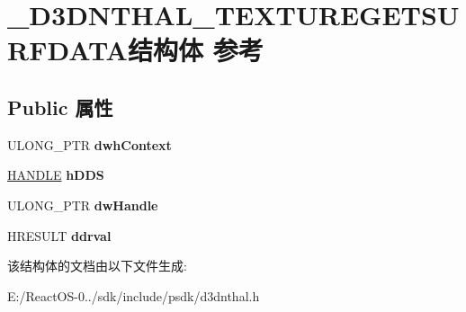 \hypertarget{struct___d3_d_n_t_h_a_l___t_e_x_t_u_r_e_g_e_t_s_u_r_f_d_a_t_a}{}\section{\+\_\+\+D3\+D\+N\+T\+H\+A\+L\+\_\+\+T\+E\+X\+T\+U\+R\+E\+G\+E\+T\+S\+U\+R\+F\+D\+A\+T\+A结构体 参考}
\label{struct___d3_d_n_t_h_a_l___t_e_x_t_u_r_e_g_e_t_s_u_r_f_d_a_t_a}
\subsection*{Public 属性}
\begin{DoxyCompactItemize}
\item 
\mbox{\label{struct___d3_d_n_t_h_a_l___t_e_x_t_u_r_e_g_e_t_s_u_r_f_d_a_t_a_adf7ccdf4cd65da4a59696a773cfc8f5a}} 
U\+L\+O\+N\+G\+\_\+\+P\+TR {\bfseries dwh\+Context}
\item 
\mbox{\label{struct___d3_d_n_t_h_a_l___t_e_x_t_u_r_e_g_e_t_s_u_r_f_d_a_t_a_a702f16fb37f6f850abd824a20e4de433}} 
\hyperlink{interfacevoid}{H\+A\+N\+D\+LE} {\bfseries h\+D\+DS}
\item 
\mbox{\label{struct___d3_d_n_t_h_a_l___t_e_x_t_u_r_e_g_e_t_s_u_r_f_d_a_t_a_aa41e8e82b981df899f1fd8ebbbd61702}} 
U\+L\+O\+N\+G\+\_\+\+P\+TR {\bfseries dw\+Handle}
\item 
\mbox{\label{struct___d3_d_n_t_h_a_l___t_e_x_t_u_r_e_g_e_t_s_u_r_f_d_a_t_a_aff2023b08077897b4a3098f387f7fc1d}} 
H\+R\+E\+S\+U\+LT {\bfseries ddrval}
\end{DoxyCompactItemize}


该结构体的文档由以下文件生成\+:\begin{DoxyCompactItemize}
\item 
E\+:/\+React\+O\+S-\/0../sdk/include/psdk/d3dnthal.\+h\end{DoxyCompactItemize}
